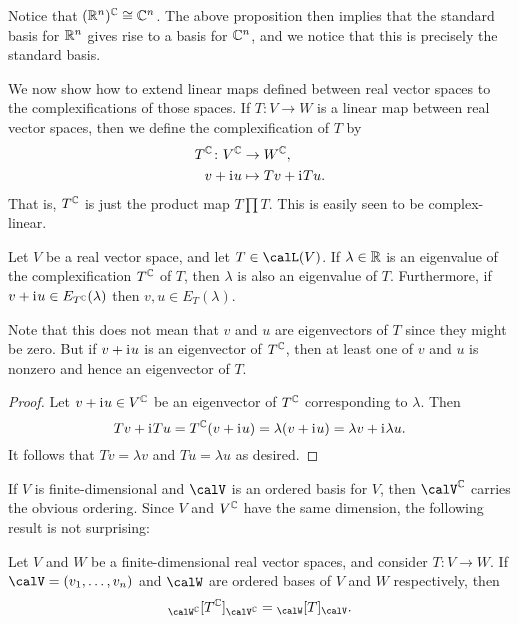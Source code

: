 \begin{example}
    Notice that $(\mathbb{R}^n)^{\mathbb{C}} \cong \mathbb{C}^n$. The above proposition then implies that the standard basis for $\mathbb{R}^n$ gives rise to a basis for $\mathbb{C}^n$, and we notice that this is precisely the standard basis.
\end{example}


We now show how to extend linear maps defined between real vector spaces to the complexifications of those spaces. If $T \colon V \to W$ is a linear map between real vector spaces, then we define the complexification of $T$ by
%
\begin{align*}
    T^{\mathbb{C}} \colon V^{\mathbb{C}} &\to W^{\mathbb{C}}, \\
    v + \mathrm{i}\mkern1mu u &\mapsto Tv + \mathrm{i}\mkern1mu Tu.
\end{align*}
%
That is, $T^{\mathbb{C}}$ is just the product map $T \prod T$. This is easily seen to be complex-linear.

\begin{proposition}
    \label{prop:complexification-eigenvalue}
    Let $V$ be a real vector space, and let $T \in \lin(V)$. If $\lambda \in \mathbb{R}$ is an eigenvalue of the complexification $T^{\mathbb{C}}$ of $T$, then $\lambda$ is also an eigenvalue of $T$. Furthermore, if $v + \mathrm{i}\mkern1mu u \in E_{T^{\mathbb{C}}}(\lambda)$ then $v,u \in E_T(\lambda)$.
\end{proposition}
%
Note that this does not mean that $v$ and $u$ are eigenvectors of $T$ since they might be zero. But if $v + \mathrm{i}\mkern1mu u$ is an eigenvector of $T^{\mathbb{C}}$, then at least one of $v$ and $u$ is nonzero and hence an eigenvector of $T$.

\begin{proof}
    Let $v + \mathrm{i}\mkern1mu u \in V^{\mathbb{C}}$ be an eigenvector of $T^{\mathbb{C}}$ corresponding to $\lambda$. Then
    \begin{equation*}
        Tv + \mathrm{i}\mkern1mu Tu
            = T^{\mathbb{C}} (v + \mathrm{i}\mkern1mu u)
            = \lambda(v + \mathrm{i}\mkern1mu u)
            = \lambda v + \mathrm{i}\mkern1mu \lambda u.
    \end{equation*}
    It follows that $Tv = \lambda v$ and $Tu = \lambda u$ as desired.
\end{proof}


If $V$ is finite-dimensional and $\calV$ is an ordered basis for $V$, then $\calV^\complex$ carries the obvious ordering. Since $V$ and $V^{\mathbb{C}}$ have the same dimension, the following result is not surprising:

\begin{proposition}
    Let $V$ and $W$ be a finite-dimensional real vector spaces, and consider $T \colon V \to W$. If $\calV = (v_1, \ldots, v_n)$ and $\calW$ are ordered bases of $V$ and $W$ respectively, then
    \begin{equation*}
        \mr{\calW^\complex}{T^\complex}{\calV^\complex}
            = \mr{\calW}{T}{\calV}.
    \end{equation*}
\end{proposition}

